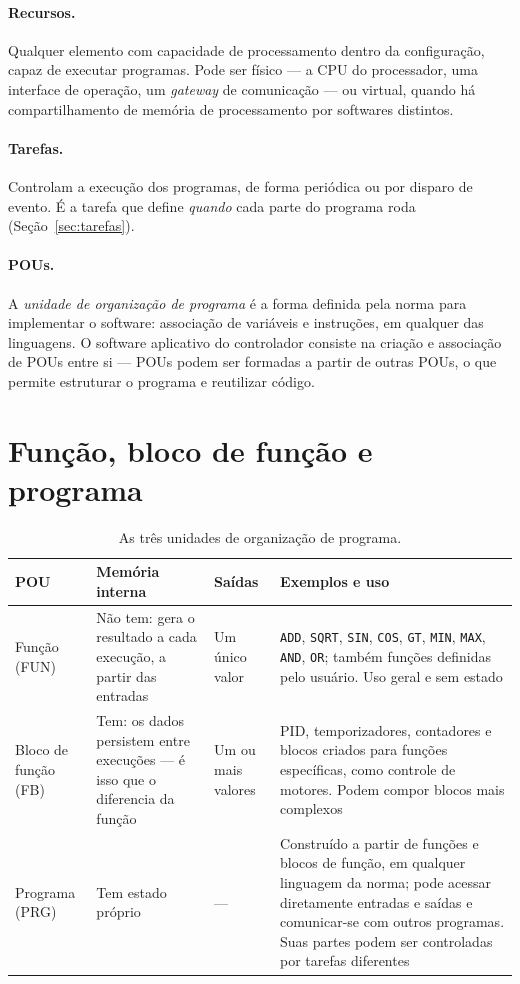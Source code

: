 \paragraph{Recursos.} Qualquer elemento com capacidade de processamento dentro da configuração,
capaz de executar programas. Pode ser físico --- a CPU do processador, uma interface de operação, um
\emph{gateway} de comunicação --- ou virtual, quando há compartilhamento de memória de processamento
por softwares distintos.

\paragraph{Tarefas.} Controlam a execução dos programas, de forma periódica ou por disparo de evento.
É a tarefa que define \emph{quando} cada parte do programa roda (Seção~\ref{sec:tarefas}).

\paragraph{POUs.} A \emph{unidade de organização de programa} é a forma definida pela norma para
implementar o software: associação de variáveis e instruções, em qualquer das linguagens. O software
aplicativo do controlador consiste na criação e associação de POUs entre si --- POUs podem ser
formadas a partir de outras POUs, o que permite estruturar o programa e reutilizar código.


\section{Função, bloco de função e programa}

\begin{table}[H]
  \centering
  \caption{As três unidades de organização de programa.}
  \label{tab:pous}
  \begin{tabular}{p{2.6cm} p{2.4cm} p{2.4cm} p{7.0cm}}
    \toprule
    POU & Memória interna & Saídas & Exemplos e uso \\
    \midrule
    Função (FUN)
      & Não tem: gera o resultado a cada execução, a partir das entradas
      & Um único valor
      & \texttt{ADD}, \texttt{SQRT}, \texttt{SIN}, \texttt{COS}, \texttt{GT}, \texttt{MIN},
        \texttt{MAX}, \texttt{AND}, \texttt{OR}; também funções definidas pelo usuário.
        Uso geral e sem estado \\
    Bloco de função (FB)
      & Tem: os dados persistem entre execuções --- é isso que o diferencia da função
      & Um ou mais valores
      & PID, temporizadores, contadores e blocos criados para funções específicas, como controle de
        motores. Podem compor blocos mais complexos \\
    Programa (PRG)
      & Tem estado próprio
      & ---
      & Construído a partir de funções e blocos de função, em qualquer linguagem da norma; pode
        acessar diretamente entradas e saídas e comunicar-se com outros programas. Suas partes podem
        ser controladas por tarefas diferentes \\
    \bottomrule
  \end{tabular}
\end{table}

